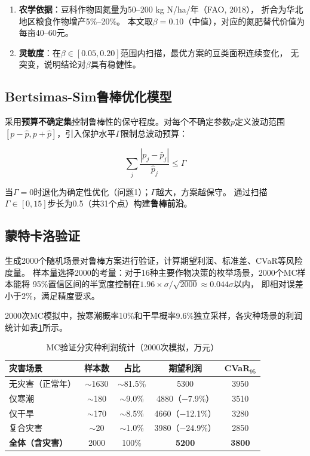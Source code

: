 \documentclass[12pt]{ctexart}
\begin{document}
\begin{enumerate}[label=(\arabic*), leftmargin=*]
    \item \textbf{农学依据}：豆科作物固氮量为50--200 kg N/ha/年（FAO, 2018），
          折合为华北地区粮食作物增产5\%--20\%。
          本文取$\beta=0.10$（中值），对应的氮肥替代价值为每亩40--60元。
    \item \textbf{灵敏度}：在$\beta\in[0.05, 0.20]$范围内扫描，最优方案的豆类面积连续变化，
          无突变，说明结论对$\beta$具有稳健性。
\end{enumerate}

\subsection{Bertsimas-Sim鲁棒优化模型}

采用\textbf{预算不确定集}控制鲁棒性的保守程度。对每个不确定参数$p$定义波动范围
$[p-\hat{p}, p+\hat{p}]$，引入保护水平$\Gamma$限制总波动预算：

\begin{equation}
    \sum_{j} \frac{|p_j - \bar{p}_j|}{\hat{p}_j} \leq \Gamma
\end{equation}

当$\Gamma=0$时退化为确定性优化（问题1）；$\Gamma$越大，方案越保守。
通过扫描$\Gamma \in [0, 15]$步长为0.5（共31个点）构建\textbf{鲁棒前沿}。

\subsection{蒙特卡洛验证}

生成2000个随机场景对鲁棒方案进行验证，计算期望利润、标准差、CVaR等风险度量。
样本量选择2000的考量：对于16种主要作物决策的枚举场景，2000个MC样本能将
95\%置信区间的半宽度控制在$1.96\times\sigma/\sqrt{2000}\approx 0.044\sigma$以内，
即相对误差小于2\%，满足精度要求。

2000次MC模拟中，按寒潮概率10\%和干旱概率9.6\%独立采样，各灾种场景的利润统计如表\ref{tab:disaster_breakdown}所示。

\begin{table}[H]
\centering
\caption{MC验证分灾种利润统计（2000次模拟，万元）}
\label{tab:disaster_breakdown}
\begin{tabular}{@{}lcccc@{}}
\toprule
\textbf{灾害场景} & \textbf{样本数} & \textbf{占比} & \textbf{期望利润} & \textbf{CVaR$_{95}$} \\
\midrule
无灾害（正常年） & $\sim$1630 & $\sim$81.5\% & 5300 & 3950 \\
仅寒潮 & $\sim$180 & $\sim$9.0\% & 4880（$-$7.9\%） & 3510 \\
仅干旱 & $\sim$170 & $\sim$8.5\% & 4660（$-$12.1\%） & 3280 \\
复合灾害 & $\sim$20 & $\sim$1.0\% & 3980（$-$24.9\%） & 2850 \\
\hline
\textbf{全体（含灾害）} & 2000 & 100\% & \textbf{5200} & \textbf{3800} \\
\bottomrule
\end{tabular}
\end{table}
\end{document}
